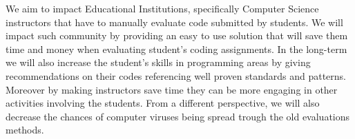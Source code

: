 
We aim to impact Educational Institutions, specifically Computer Science
instructors that have to manually evaluate code submitted by students. We will
impact such community by providing an easy to use solution that will save them
time and money when evaluating student's coding assignments. In the long-term we
will also increase the student's skills in programming areas by giving
recommendations on their codes referencing well proven standards and patterns.
Moreover by making instructors save time they can be more engaging in other
activities involving the students. From a different perspective, we will also
decrease the chances of computer viruses being spread trough the old evaluations
methods.
